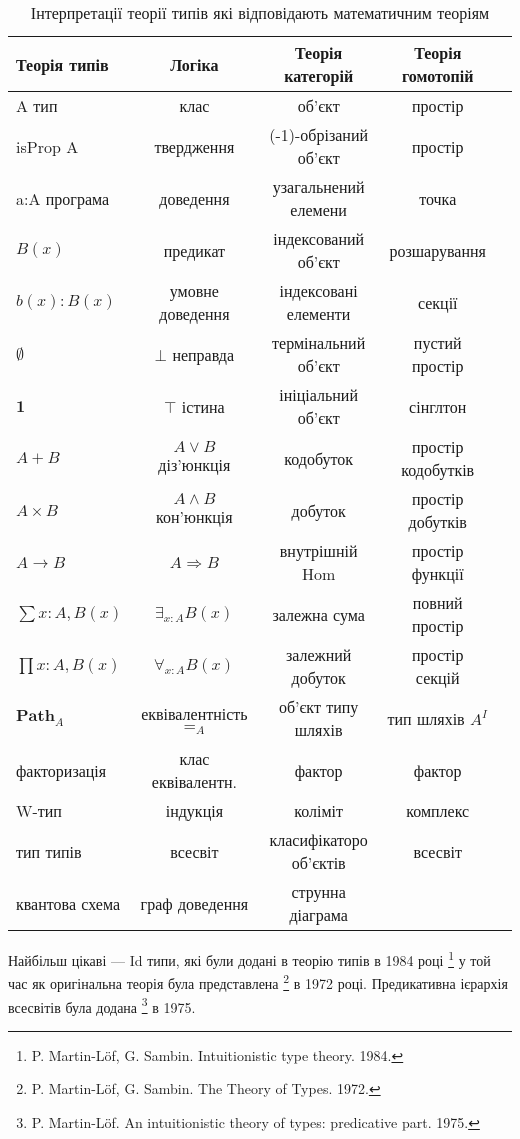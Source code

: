 \begin{table}[h]
\begin{adjustwidth}{-3cm}{}
  \caption{Інтерпретації теорії типів які відповідають математичним теоріям}
 \begin{tabular}{lcccc}
    \hline
\rowcolor{ZimaBlue}
       \textbf{Теорія типів} & \textbf{Логіка} & \textbf{Теорія категорій} & \textbf{Теорія гомотопій} \\
    \hline
       A тип & клас & об'єкт & простір \\
       isProp A & твердження & (-1)-обрізаний об'єкт & простір \\
       a:A програма & доведення & узагальнений елемени & точка \\
       $B(x)$ & предикат & індексований об'єкт & розшарування \\
       $b(x) : B(x)$ & умовне доведення & індексовані елементи & секції\\
       $\emptyset$ & $\bot$ неправда & термінальний об'єкт & пустий простір \\
       $\mathbf{1}$ & $\top$ істина & ініціальний об'єкт & сінглтон \\
       $A + B$ & $A\vee B$ діз'юнкція & кодобуток & простір кодобутків \\
       $A\times B$ & $A\wedge B$ кон'юнкція & добуток & простір добутків \\
       $A\to B$ & $A\Rightarrow B$ & внутрішній Hom & простір функції \\
       $\sum{x:A},B(x)$ & $\exists_{x:A}B(x)$ & залежна сума & повний простір \\
       $\prod{x:A},B(x)$ & $\forall_{x:A}B(x)$ & залежний добуток & простір секцій\\
       $\mathbf{Path}_{A}$ & еквівалентність $=_A$ & об'єкт типу шляхів & тип шляхів $A^I$ \\
       факторизація & клас еквівалентн. & фактор & фактор \\
       W-тип & індукція & коліміт & комплекс\\
       тип типів & всесвіт & класифікаторо об'єктів & всесвіт \\
       квантова схема & граф доведення & струнна діаграма & \\
      \hline
  \end{tabular}
  \end{adjustwidth}
\end{table}

Найбільш цікаві --- Id типи, які були додані в теорію типів в 1984 році
\footnote{P. Martin-Löf, G. Sambin. Intuitionistic type theory. 1984.}
у той час як оригінальна теорія була представлена
\footnote{P. Martin-Löf, G. Sambin. The Theory of Types. 1972.} в 1972 році.
Предикативна ієрархія всесвітів була додана \footnote{P. Martin-Löf. An
intuitionistic theory of types: predicative part. 1975.} в 1975.

